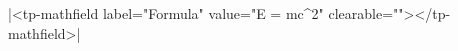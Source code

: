 \documentclass{article}
\begin{document}
\rawhtml|<tp-mathfield label="Formula" value="E = mc^2" clearable=""></tp-mathfield>|
\end{document}
